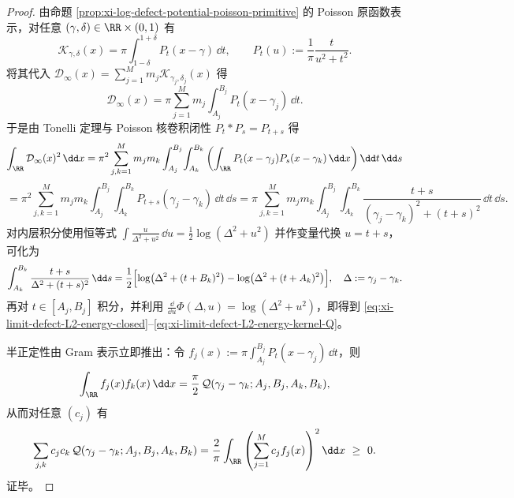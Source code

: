 \begin{proof}
由命题 \ref{prop:xi-log-defect-potential-poisson-primitive} 的 Poisson 原函数表示，对任意 \((\gamma,\delta)\in\RR\times(0,1)\) 有
\[
\mathcal{K}_{\gamma,\delta}(x)=\pi\int_{1-\delta}^{1+\delta}P_t(x-\gamma)\,\dd t,
\qquad
P_t(u):=\frac{1}{\pi}\frac{t}{u^2+t^2}.
\]
将其代入 \(\mathcal{D}_\infty(x)=\sum_{j=1}^{M}m_j\mathcal{K}_{\gamma_j,\delta_j}(x)\) 得
\[
\mathcal{D}_\infty(x)
=\pi\sum_{j=1}^{M}m_j\int_{A_j}^{B_j}P_t(x-\gamma_j)\,\dd t.
\]
于是由 Tonelli 定理与 Poisson 核卷积闭性 \(P_t*P_s=P_{t+s}\) 得
\[
\int_{\RR}\mathcal{D}_\infty(x)^2\,\dd x
=\pi^2\sum_{j,k=1}^{M}m_jm_k\int_{A_j}^{B_j}\!\int_{A_k}^{B_k}
\left(\int_{\RR}P_t(x-\gamma_j)P_s(x-\gamma_k)\,\dd x\right)\dd t\,\dd s
\]
\[
=\pi^2\sum_{j,k=1}^{M}m_jm_k\int_{A_j}^{B_j}\!\int_{A_k}^{B_k}
P_{t+s}(\gamma_j-\gamma_k)\,\dd t\,\dd s
=\pi\sum_{j,k=1}^{M}m_jm_k\int_{A_j}^{B_j}\!\int_{A_k}^{B_k}
\frac{t+s}{(\gamma_j-\gamma_k)^2+(t+s)^2}\,\dd t\,\dd s.
\]
对内层积分使用恒等式
\(
\int \frac{u}{\Delta^2+u^2}\,\dd u=\frac12\log(\Delta^2+u^2)
\)
并作变量代换 \(u=t+s\)，可化为
\[
\int_{A_k}^{B_k}\frac{t+s}{\Delta^2+(t+s)^2}\,\dd s
=\frac12\Bigl[\log\bigl(\Delta^2+(t+B_k)^2\bigr)-\log\bigl(\Delta^2+(t+A_k)^2\bigr)\Bigr],
\quad \Delta:=\gamma_j-\gamma_k.
\]
再对 \(t\in[A_j,B_j]\) 积分，并利用 \(\frac{\dd}{\dd u}\Phi(\Delta,u)=\log(\Delta^2+u^2)\)，即得到
\eqref{eq:xi-limit-defect-L2-energy-closed}--\eqref{eq:xi-limit-defect-L2-energy-kernel-Q}。
\par
半正定性由 Gram 表示立即推出：令
\(
f_j(x):=\pi\int_{A_j}^{B_j}P_t(x-\gamma_j)\,\dd t
\)，则
\[
\int_{\RR}f_j(x)f_k(x)\,\dd x=\frac{\pi}{2}\,\mathcal{Q}(\gamma_j-\gamma_k;A_j,B_j,A_k,B_k),
\]
从而对任意 \((c_j)\) 有
\[
\sum_{j,k}c_jc_k\,\mathcal{Q}(\gamma_j-\gamma_k;A_j,B_j,A_k,B_k)
=\frac{2}{\pi}\int_{\RR}\left(\sum_{j=1}^{M}c_j f_j(x)\right)^{2}\dd x\ \ge\ 0.
\]
证毕。
\end{proof}

\endinput
